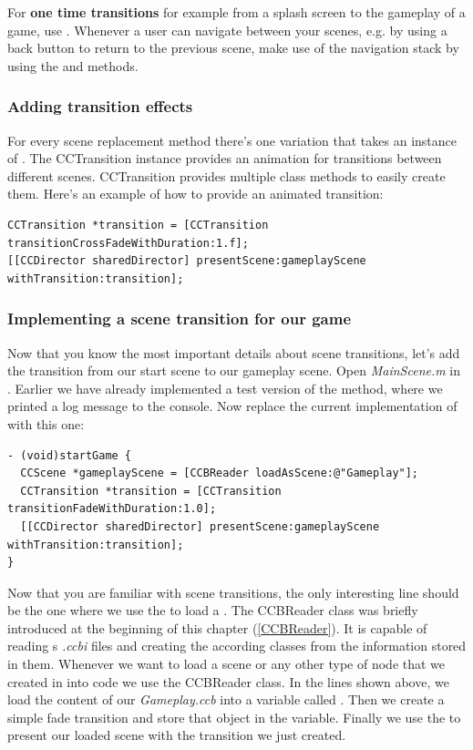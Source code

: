 \begin{bestpractice}[frametitle={Scene transitions - the right way}] 
For \textbf{one time transitions} for example from a splash screen to the
gameplay of a game, use . Whenever a user can navigate
between your scenes, e.g. by using a back button to return to the previous
scene, make use of the navigation stack by using the  and
 methods.
\end{bestpractice}

\subsubsection{Adding transition effects}
For every scene replacement method there's one variation that takes an instance
of . The CCTransition instance provides an animation
for transitions between different scenes. CCTransition provides multiple class
methods to easily create them. Here's an example of how to provide an animated
transition:
\begin{lstlisting}
CCTransition *transition = [CCTransition transitionCrossFadeWithDuration:1.f];
[[CCDirector sharedDirector] presentScene:gameplayScene
withTransition:transition];
\end{lstlisting}

\subsubsection{Implementing a scene transition for our game}
Now that you know the most important details about scene transitions, let's add
the transition from our start scene to our gameplay scene. Open
\textit{MainScene.m} in \xcode{}. Earlier we have already implemented a test
version of the  method, where we printed a log message to
the console. Now replace the current implementation of 
with this one:
\begin{lstlisting}
- (void)startGame {
  CCScene *gameplayScene = [CCBReader loadAsScene:@"Gameplay"];
  CCTransition *transition = [CCTransition transitionFadeWithDuration:1.0];
  [[CCDirector sharedDirector] presentScene:gameplayScene withTransition:transition];
}
\end{lstlisting}
Now that you are familiar with scene transitions, the only interesting line
should be the one where we use the  to
load a \ccbfile{}. The CCBReader class was briefly introduced at the beginning
of this chapter (\ref{CCBReader}). It is capable of reading \SB{}s
\textit{.ccbi} files and creating the according \cocos{} classes from the
information stored in them. Whenever we want to load a scene or any
other type of node that we created in \SB{} into code we use the CCBReader
class. In the lines shown above, we load the content of our
\textit{Gameplay.ccb} into a variable called . Then we
create a simple fade transition and store that object in the
 variable. Finally we use the  to
present our loaded scene with the transition we just created. 

